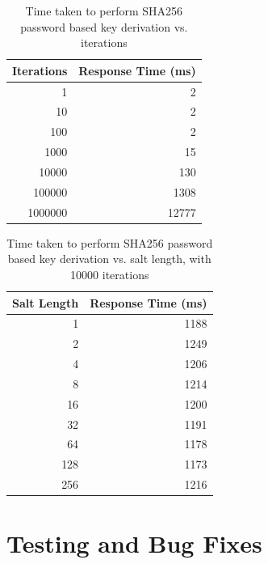 \documentclass[12pt]{report}
\begin{document}

\begin{table}[!h]
    \centering
    \begin{tabular}{| r | r |}
        \hline
        Iterations & Response Time (ms) \\ \hline
        1 & 2 \\ \hline
        10 & 2 \\ \hline
        100 & 2 \\ \hline
        1000 & 15 \\ \hline
        10000 & 130 \\ \hline
        100000 & 1308 \\ \hline
        1000000 & 12777 \\ \hline
    \end{tabular}
    \caption{Time taken to perform SHA256 password based key derivation vs. iterations}
    \label{tab:sha256-performance}
\end{table}

\begin{table}[!h]
    \centering
    \begin{tabular}{| r | r |}
        \hline
        Salt Length & Response Time (ms) \\ \hline
        1 & 1188 \\ \hline
        2 & 1249 \\ \hline
        4 & 1206 \\ \hline
        8 & 1214 \\ \hline
        16 & 1200 \\ \hline
        32 & 1191 \\ \hline
        64 & 1178 \\ \hline
        128 & 1173 \\ \hline
        256 & 1216 \\ \hline
    \end{tabular}
    \caption{Time taken to perform SHA256 password based key derivation vs. salt length, with 10000 iterations}
    \label{tab:sha256-salt-performance}
\end{table}


\chapter{Testing and Bug Fixes} \label{testing-and-bug-fixes}
\end{document}
